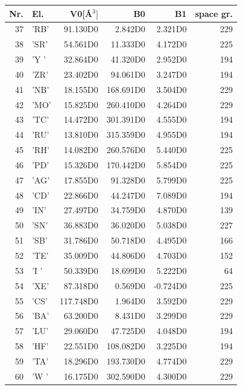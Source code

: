 \documentclass[11pt,a4paper]{report}
\begin{document}
\begin{table}[ht]
\begin{center}
\begin{tabular}{|r|l|r|r|r|r|}
\hline
Nr. & El. & V0[{\AA}$^3]$ & B0 & B1 & space gr.\\
\hline
 37 & 'RB'&    91.130D0&     2.842D0&     2.321D0&229 \\
 38 & 'SR'&    54.561D0&    11.333D0&     4.172D0&225 \\
 39 & 'Y '&    32.864D0&    41.320D0&     2.952D0&194 \\
 40 & 'ZR'&    23.402D0&    94.061D0&     3.247D0&194 \\
 41 & 'NB'&    18.155D0&   168.691D0&     3.504D0&229 \\
 42 & 'MO'&    15.825D0&   260.410D0&     4.264D0&229 \\
 43 & 'TC'&    14.472D0&   301.391D0&     4.555D0&194 \\
 44 & 'RU'&    13.810D0&   315.359D0&     4.955D0&194 \\
 45 & 'RH'&    14.082D0&   260.576D0&     5.440D0&225 \\
 46 & 'PD'&    15.326D0&   170.442D0&     5.854D0&225 \\
 47 & 'AG'&    17.855D0&    91.328D0&     5.799D0&225 \\
 48 & 'CD'&    22.866D0&    44.247D0&     7.089D0&194 \\
 49 & 'IN'&    27.497D0&    34.759D0&     4.870D0&139 \\
 50 & 'SN'&    36.883D0&    36.020D0&     5.038D0&227 \\
 51 & 'SB'&    31.786D0&    50.718D0&     4.495D0&166 \\
 52 & 'TE'&    35.009D0&    44.806D0&     4.703D0&152 \\
 53 & 'I '&    50.339D0&    18.699D0&     5.222D0& 64 \\
 54 & 'XE'&    87.318D0&     0.569D0&    -0.724D0&225 \\
 55 & 'CS'&   117.748D0&     1.964D0&     3.592D0&229 \\
 56 & 'BA'&    63.200D0&     8.431D0&     3.299D0&229 \\
 57 & 'LU'&    29.060D0&    47.725D0&     4.048D0&194 \\
 58 & 'HF'&    22.551D0&   108.082D0&     3.225D0&194 \\
 59 & 'TA'&    18.296D0&   193.730D0&     4.774D0&229 \\
 60 & 'W '&    16.175D0&   302.590D0&     4.300D0&229 \\

\end{tabular}
\end{center}
\end{table}
\end{document}
